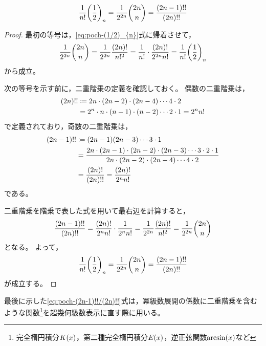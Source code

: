\documentclass[a4paper,draft]{ltjsarticle}
\begin{document}
\begin{prop}\label{prop:poch-二重階乗}
    \begin{equation}
        \frac{1}{n!}\poch{\frac{1}{2}}{n}=\frac{1}{2^{2n}}\binom{2n}{n}=\frac{\pare{2n-1}!!}{\pare{2n}!!} \label{eq:poch-(2n-1)!!/(2n)!!}
    \end{equation}
    \begin{proof}
        最初の等号は，\eqref{eq:poch-(1/2)_{n}}式に帰着させて，
        \begin{equation}
            \frac{1}{2^{2n}}\binom{2n}{n}=\frac{1}{2^{2n}}\frac{\pare{2n}!}{n!^2}=\frac{1}{n!}\cdot\dfrac{\pare{2n}!}{2^{2n}n!}=\frac{1}{n!}\poch{\frac{1}{2}}{n}
        \end{equation}
        から成立。

        次の等号を示す前に，二重階乗の定義を確認しておく。
        偶数の二重階乗は，
        \begin{align}
            \pare{2n}!!&\coloneqq 2n\cdot \pare{2n-2}\cdot\pare{2n-4}\cdots 4\cdot 2
            \\
            &=2^n\cdot n\cdot \pare{n-1}\cdot \pare{n-2}\cdots 2\cdot 1=2^n n!
        \end{align}
        で定義されており，奇数の二重階乗は，
        \begin{align}
            \pare{2n-1}!!&\coloneqq \pare{2n-1}\pare{2n-3}\cdots 3\cdot 1
            \\
            &=\frac{2n\cdot \pare{2n-1}\cdot \pare{2n-2}\cdot\pare{2n-3}\cdots 3\cdot 2\cdot 1}{ 2n\cdot \pare{2n-2}\cdot\pare{2n-4}\cdots 4\cdot 2}
            \\
            &=\frac{\pare{2n}!}{\pare{2n}!!}=\frac{\pare{2n}!}{2^n n!}
        \end{align}
        である。

        二重階乗を階乗で表した式を用いて最右辺を計算すると，
        \begin{equation}
            \frac{\pare{2n-1}!!}{\pare{2n}!!}=\frac{\pare{2n}!}{2^n n!}\cdot \frac{1}{2^n n!}=\frac{1}{2^{2n}}\frac{\pare{2n}!}{n!^2}=\frac{1}{2^{2n}}\binom{2n}{n}
        \end{equation}
        となる。
        よって，
        \begin{equation}
            \frac{1}{n!}\poch{\frac{1}{2}}{n}=\frac{1}{2^{2n}}\binom{2n}{n}=\frac{\pare{2n-1}!!}{\pare{2n}!!}
        \end{equation}
        が成立する。
    \end{proof}
\end{prop}

最後に示した\eqref{eq:poch-(2n-1)!!/(2n)!!}式は，冪級数展開の係数に二重階乗を含むような関数\footnote{完全楕円積分$\fun{K}{x}$，第二種完全楕円積分$\fun{E}{x}$，逆正弦関数$\fun{\arcsin}{x}$など}を超幾何級数表示に直す際に用いる。
\end{document}
